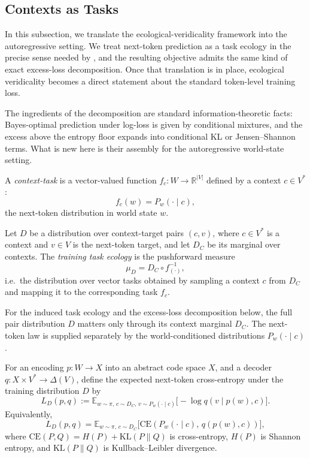 \documentclass[twoside,11pt]{article}
\newcommand{\E}{\mathbb{E}}
\newcommand{\R}{\mathbb{R}}
\newcommand{\KL}{\mathrm{KL}}
\newcommand{\CE}{\mathrm{CE}}
\begin{document}
\subsection{Contexts as Tasks}

In this subsection, we translate the ecological-veridicality framework into the autoregressive setting. We treat next-token prediction as a task ecology in the precise sense needed by \citet{dallariva_2026}, and the resulting objective admits the same kind of exact excess-loss decomposition. Once that translation is in place, ecological veridicality becomes a direct statement about the standard token-level training loss.

The ingredients of the decomposition are standard information-theoretic facts: Bayes-optimal prediction under log-loss is given by conditional mixtures, and the excess above the entropy floor expands into conditional KL or Jensen--Shannon terms. What is new here is their assembly for the autoregressive world-state setting.

\begin{definition}\label{def:context-task}
A \emph{context-task} is a vector-valued function $f_c \colon W \to \R^{|V|}$ defined by a context $c \in V^*$:
\[
f_c(w) = P_w(\cdot \mid c),
\]
the next-token distribution in world state $w$.
\end{definition}

\begin{definition}\label{def:train-ecology}
Let $D$ be a distribution over context-target pairs $(c, v)$, where $c \in V^*$ is a context and $v \in V$ is the next-token target, and let $D_C$ be its marginal over contexts. The \emph{training task ecology} is the pushforward measure
\[
\mu_D = D_C \circ f^{-1}_{(\cdot)},
\]
i.e.\ the distribution over vector tasks obtained by sampling a context $c$ from $D_C$ and mapping it to the corresponding task $f_c$.
\end{definition}

For the induced task ecology and the excess-loss decomposition below, the full pair distribution $D$ matters only through its context marginal $D_C$. The next-token law is supplied separately by the world-conditioned distributions $P_w(\cdot \mid c)$.

\begin{definition}\label{def:ce-risk}
For an encoding $p \colon W \to X$ into an abstract code space $X$, and a decoder $q \colon X \times V^* \to \Delta(V)$, define the expected next-token cross-entropy under the training distribution $D$ by
\[
L_D(p,q)
:= \E_{w \sim \pi,\, c \sim D_C,\, v \sim P_w(\cdot \mid c)}
   \bigl[-\log q(v \mid p(w),c)\bigr].
\]
Equivalently,
\[
L_D(p,q)
= \E_{w \sim \pi,\, c \sim D_C}
  \bigl[\CE(P_w(\cdot \mid c),\, q(p(w),c))\bigr],
\]
where $\CE(P,Q) = H(P) + \KL(P \| Q)$ is cross-entropy, $H(P)$ is Shannon entropy, and $\KL(P\|Q)$ is Kullback--Leibler divergence.
\end{definition}
\end{document}
